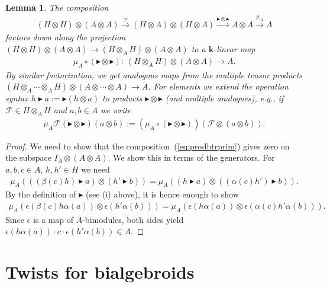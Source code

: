 \documentclass[10pt,a4paper]{amsart}
\newtheorem{Lemma}[Theorem]{Lemma}
\numberwithin{equation}{section}
\begin{document}
\begin{Lemma}\label{lem:prodbtr}
The composition
\begin{gather}\label{eq:prodbtrprim}
(H\otimes H)\otimes (A\otimes A) \stackrel\cong\longrightarrow (H\otimes A) \otimes (H\otimes A)\stackrel{\blacktriangleright\otimes\blacktriangleright}\longrightarrow A\otimes A\stackrel{\mu_A}\longrightarrow A
\end{gather}
factors down along the projection $(H\otimes H)\otimes(A\otimes A) \to (H\otimes_A H)\otimes(A\otimes A)$ to a $\mathbf{k}$-linear map
\begin{gather*}
\mu_A\circ(\blacktriangleright\otimes\blacktriangleright)\colon \ (H\otimes_A H)\otimes (A\otimes A)\longrightarrow A.
\end{gather*}
By similar factorization, we get analogous maps from the multiple tensor products $(H\otimes_A\cdots\otimes_A H)\otimes(A\otimes\cdots\otimes A)\to A$. For elements we extend the operation syntax $h\blacktriangleright a := \blacktriangleright (h\otimes a)$ to products $\blacktriangleright\otimes\blacktriangleright$ (and multiple analogues), e.g., if $\mathcal{F}\in H\otimes_A H$ and $a,b\in A$ we write
\begin{gather*}\mu_A \mathcal{F}(\blacktriangleright\otimes\blacktriangleright)(a\otimes b):= (\mu_A\circ(\blacktriangleright\otimes\blacktriangleright))(\mathcal{F}
\otimes (a\otimes b)).\end{gather*}
\end{Lemma}
\begin{proof} We need to show that the composition~(\ref{eq:prodbtrprim}) gives zero on the subspace $I_A\otimes(A\otimes A)$. We show this in terms of the generators. For $a,b,c\in A$, $h,h'\in H$ we need
\begin{gather*}
\mu_A (((\beta(c) h)\blacktriangleright a)\otimes (h'\blacktriangleright b)) = \mu_A ((h\blacktriangleright a)\otimes((\alpha(c)h')\blacktriangleright b)).
\end{gather*}
By the definition of $\blacktriangleright$ (see (i) above), it is hence enough to show
\begin{gather*}
\mu_A (\epsilon(\beta(c) h \alpha(a))\otimes\epsilon(h'\alpha(b)))= \mu_A (\epsilon(h\alpha(a))\otimes\epsilon(\alpha(c)h'\alpha(b))).
\end{gather*}
Since $\epsilon$ is a map of $A$-bimodules, both sides yield $\epsilon(h\alpha(a)) \cdot c\cdot \epsilon(h' \alpha(b))\in A$.
\end{proof}

\section{Twists for bialgebroids}\label{s:gentwist}
\end{document}
